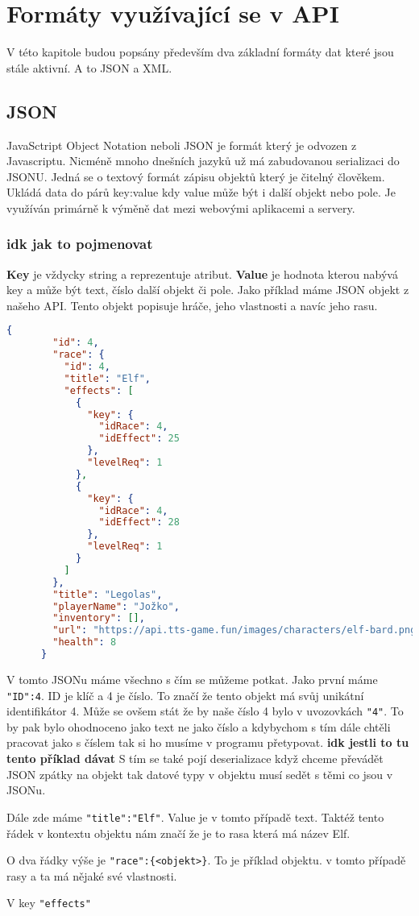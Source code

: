 \chapter{Formáty využívající se v API}
V této kapitole budou popsány především dva základní formáty dat které jsou stále aktivní. A to JSON a XML.

\section{JSON}
JavaSctript Object Notation neboli JSON je formát který je odvozen z Javascriptu. Nicméně mnoho dnešních jazyků už má zabudovanou serializaci do JSONU. Jedná se o textový formát zápisu objektů který je čitelný člověkem. Ukládá data do párů key:value kdy value může být i další objekt nebo pole. Je využíván primárně k výměně dat mezi webovými aplikacemi a servery.

\subsection{idk jak to pojmenovat}
\textbf{Key} je vždycky string a reprezentuje atribut. \textbf{Value} je hodnota kterou nabývá key a může být text, číslo další objekt či pole. Jako příklad máme JSON objekt z našeho API. Tento objekt popisuje hráče, jeho vlastnosti a navíc jeho rasu.
\begin{lstlisting}[language=json, caption=Příklad JSON dokumentu]
    {
        "id": 4,
        "race": {
          "id": 4,
          "title": "Elf",
          "effects": [
            {
              "key": {
                "idRace": 4,
                "idEffect": 25
              },
              "levelReq": 1
            },
            {
              "key": {
                "idRace": 4,
                "idEffect": 28
              },
              "levelReq": 1
            }
          ]
        },
        "title": "Legolas",
        "playerName": "Jožko",
        "inventory": [],
        "url": "https://api.tts-game.fun/images/characters/elf-bard.png",
        "health": 8
      }
\end{lstlisting}

V tomto JSONu máme všechno s čím se můžeme potkat. Jako první máme \verb|"ID":4|. ID je klíč a 4 je číslo. To značí že tento objekt má svůj unikátní identifikátor 4. Může se ovšem stát že by naše číslo 4 bylo v uvozovkách \verb|"4"|. To by pak bylo ohodnoceno jako text ne jako číslo a kdybychom s tím dále chtěli pracovat jako s číslem tak si ho musíme v programu přetypovat. \textbf{idk jestli to tu tento příklad dávat }S tím se také pojí deserializace když chceme převádět JSON zpátky na objekt tak datové typy v objektu musí sedět s těmi co jsou v JSONu.

Dále zde máme \verb|"title":"Elf"|. Value je v tomto případě text. Taktéž tento řádek v kontextu objektu nám značí že je to rasa která má název Elf.

O dva řádky výše je \verb|"race":{<objekt>}|. To je příklad objektu. v tomto případě rasy a ta má nějaké své vlastnosti.

V key \texttt{"effects"}


\endinput